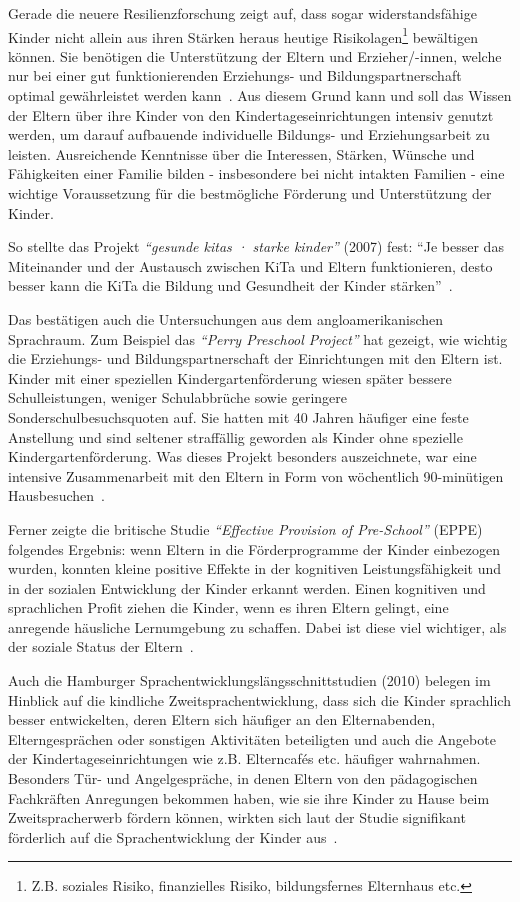 \documentclass[12pt,a4paper]{article}
\begin{document}
Gerade die neuere Resilienzforschung zeigt auf, dass sogar widerstandsfähige Kinder nicht allein aus ihren Stärken heraus heutige Risikolagen\footnote{Z.B. soziales Risiko, finanzielles Risiko, bildungsfernes Elternhaus etc.} bewältigen können. Sie benötigen die Unterstützung der Eltern und Erzieher/-innen, welche nur bei einer gut funktionierenden Erziehungs- und Bildungspartnerschaft optimal gewährleistet werden kann~\parencite[S.~33]{Aichinger_2011}. Aus diesem Grund kann und soll das Wissen der Eltern über ihre Kinder von den Kindertageseinrichtungen intensiv genutzt werden, um darauf aufbauende individuelle Bildungs- und Erziehungsarbeit zu leisten. Ausreichende Kenntnisse über die Interessen, Stärken, Wünsche und Fähigkeiten einer Familie bilden - insbesondere bei nicht intakten Familien - eine wichtige Voraussetzung für die bestmögliche Förderung und Unterstützung der Kinder.

	So stellte das Projekt \textit{"`gesunde kitas · starke kinder"'} (2007) fest: "`Je besser das Miteinander und der Austausch zwischen KiTa und Eltern funktionieren, desto besser kann die KiTa die Bildung und Gesundheit der Kinder stärken"'~\parencite[S.~50]{PEB}.
	
Das bestätigen auch die Untersuchungen aus dem angloamerikanischen Sprachraum. Zum Beispiel das \textit{"`Perry Preschool Project"'} hat gezeigt, wie wichtig die Erziehungs- und Bildungspartnerschaft der Einrichtungen mit den Eltern ist. Kinder mit einer speziellen Kindergartenförderung wiesen später bessere Schulleistungen, weniger Schulabbrüche sowie geringere Sonderschulbesuchsquoten auf. Sie hatten mit 40 Jahren häufiger eine feste Anstellung und sind seltener straffällig geworden als Kinder ohne spezielle Kindergartenförderung. Was dieses Projekt besonders auszeichnete, war eine intensive Zusammenarbeit mit den Eltern in Form von wöchentlich 90-minütigen Hausbesuchen~\parencite[S.~1-18]{Schweinhart}.

Ferner zeigte die britische Studie \textit{"`Effective Provision of Pre-School"'} (EPPE) folgendes Ergebnis: wenn Eltern in die Förderprogramme der Kinder einbezogen wurden, konnten kleine positive Effekte in der kognitiven Leistungsfähigkeit und in der sozialen Entwicklung der Kinder erkannt werden. Einen kognitiven und sprachlichen Profit ziehen die Kinder, wenn es ihren Eltern gelingt, eine anregende häusliche Lernumgebung zu schaffen. Dabei ist diese viel wichtiger, als der soziale Status der Eltern~\parencite[S.~25]{Sylva_2004}.

	Auch die Hamburger Sprachentwicklungslängsschnittstudien (2010) belegen im Hinblick auf die kindliche Zweitsprachentwicklung, dass sich die Kinder sprachlich besser entwickelten, deren Eltern sich häufiger an den Elternabenden, Elterngesprächen oder sonstigen Aktivitäten beteiligten und auch die Angebote der Kindertageseinrichtungen wie z.B. Elterncafés etc. häufiger wahrnahmen. Besonders Tür- und Angelgespräche, in denen Eltern von den pädagogischen Fachkräften Anregungen bekommen haben, wie sie ihre Kinder zu Hause beim Zweitspracherwerb fördern können, wirkten sich laut der Studie signifikant förderlich auf die Sprachentwicklung der Kinder aus~\parencite[S.~206-209]{Hildenbrand}.
\end{document}
